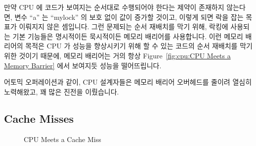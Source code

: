 만약 CPU 에 코드가 보여지는 순서대로 수행되어야 한다는 제약이 존재하지
않는다면, 변수 ``a'' 는 ``mylock'' 의 보호 없이 값이 증가할 것이고, 이렇게 되면
락을 잡는 목표가 이뤄지지 않은 셈입니다.
그런 문제되는 순서 재배치를 막기 위해, 락킹에 사용되는 기본 기능들은 명시적이든
묵시적이든 메모리 배리어를 사용합니다.
이런 메모리 배리어의 목적은 CPU 가 성능을 향상시키기 위해 할 수 있는 코드의
순서 재배치를 막기 위한 것이기 때문에, 메모리 배리어는 거의 항상
Figure~\ref{fig:cpu:CPU Meets a Memory Barrier} 에서 보여지듯 성능을
떨어뜨립니다.

어토믹 오퍼레이션과 같이, CPU 설계자들은 메모리 배리어 오버헤드를 줄이려 열심히
노력해왔고, 꽤 많은 진전을 이뤘습니다.

\subsection{Cache Misses}
\label{sec:cpu:Cache Misses}

\begin{figure}[tb]
\begin{center}
\end{center}
\caption{CPU Meets a Cache Miss}
\end{figure}

